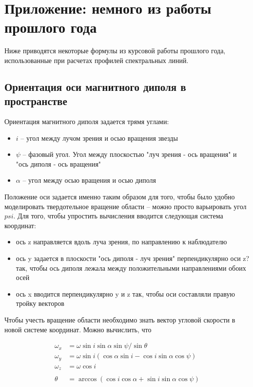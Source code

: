 \documentclass{article}
\begin{document}
\pagebreak

\section{Приложение: немного из работы прошлого года}

Ниже приводятся некоторые формулы из курсовой работы прошлого года, использованные при расчетах профилей спектральных линий.

\subsection{Ориентация оси магнитного диполя в пространстве}

Ориентация магнитного диполя задается трямя углами:
\begin{itemize}
\item $i$ -- угол между лучом зрения и осью вращения звезды
\item $\psi$ -- фазовый угол. Угол между плоскостью "луч зрения - ось вращения" и "ось диполя - ось вращения"
\item $\alpha$ -- угол между осью вращения и осью диполя
\end{itemize}

Положение оси задается именно таким образом для того, чтобы было удобно моделировать твердотельное вращение области -- можно просто варьировать угол $psi$. Для того, чтобы упростить вычисления вводится следующая система координат: 
\begin{itemize}
\item ось z направляется вдоль луча зрения, по направлению к наблюдателю
\item ось y задается в плоскости "ось диполя - луч зрения" перпендикулярно оси z? так, чтобы ось диполя лежала между положительными направлениями обоих осей
\item ось x вводится перпендикулярно y и z так, чтобы оси составляли правую тройку векторов
\end{itemize}

Чтобы учесть вращение области необходимо знать вектор угловой скорости в новой системе координат. Можно вычислить, что

\[
\begin{aligned}
\omega_x & = \omega \sin i \sin \alpha \sin \psi / \sin \theta \\
\omega_y & = \omega \sin i (\cos \alpha \sin i - \cos i \sin \alpha \cos \psi) \\
\omega_z & = \omega \cos i \\
\\
\theta & = \arccos (\cos i \cos \alpha + \sin i \sin \alpha \cos \psi)
\end{aligned}
\]
\end{document}
